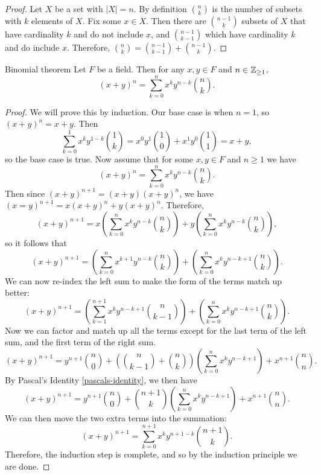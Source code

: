 \begin{proof}
    Let $X$ be a set with $|X| = n$. By definition $\binom{n}{k}$ is the number of subsets with $k$ elements of $X$. Fix some $x \in X$. Then there are $\binom{n-1}{k}$ subsets of $X$ that have cardinality $k$ and do not include $x$, and $\binom{n-1}{k-1}$ which have cardinality $k$ and do include $x$. Therefore, $\binom{n}{k} = \binom{n-1}{k-1} + \binom{n-1}{k}$.
\end{proof}

\begin{thm}{Binomial theorem}\label{binomial-theorem}\proofbreak
    Let $F$ be a field. Then for any $x, y \in F$ and $n \in \mathbb{Z}_{\geq 1}$, \[\left(x + y\right)^n = \sum_{k=0}^n x^ky^{n-k}\binom{n}{k}.\]
\end{thm}

\begin{proof}
    We will prove this by induction. Our base case is when $n = 1$, so $(x + y)^n = x + y$. Then \[\sum_{k=0}^{1}x^ky^{1-k}\binom{1}{k} = x^0y^1\binom{1}{0} + x^1y^0\binom{1}{1} = x + y,\] so the base case is true.
    Now assume that for some $x, y \in F$ and $n \geq 1$ we have \[\left(x + y\right)^n = \sum_{k=0}^n x^ky^{n-k}\binom{n}{k}.\] Then since $(x + y)^{n+1} = (x+y)(x+y)^n$, we have $(x = y)^{n+1} = x(x+y)^n + y(x+y)^n$.
    Therefore, \[\left(x + y\right)^{n+1} = x\left(\sum_{k=0}^n x^ky^{n-k}\binom{n}{k}\right) + y\left(\sum_{k=0}^n x^ky^{n-k}\binom{n}{k}\right),\] so it follows that \[\left(x + y\right)^{n+1} = \left(\sum_{k=0}^n x^{k+1}y^{n-k}\binom{n}{k}\right) + \left(\sum_{k=0}^n x^ky^{n-k+1}\binom{n}{k}\right).\]
    We can now re-index the left sum to make the form of the terms match up better: \[\left(x + y\right)^{n+1} = \left(\sum_{k=1}^{n+1} x^{k}y^{n-k+1}\binom{n}{k-1}\right) + \left(\sum_{k=0}^n x^ky^{n-k+1}\binom{n}{k}\right).\]
    Now we can factor and match up all the terms except for the last term of the left sum, and the first term of the right sum.
    \[\left(x + y\right)^{n+1} = y^{n+1}\binom{n}{0} + \left(\binom{n}{k-1} + \binom{n}{k}\right)\left(\sum_{k=0}^{n} x^{k}y^{n-k+1}\right) + x^{n+1}\binom{n}{n}.\]
    By Pascal's Identity \ref{pascals-identity}, we then have
    \[\left(x + y\right)^{n+1} = y^{n+1}\binom{n}{0} + \binom{n+1}{k}\left(\sum_{k=0}^{n} x^{k}y^{n-k+1}\right) + x^{n+1}\binom{n}{n}.\]
    We can then move the two extra terms into the summation:
    \[\left(x + y\right)^{n+1} = \sum_{k=0}^{n+1}x^{k}y^{n+1-k}\binom{n+1}{k}.\]
    Therefore, the induction step is complete, and so by the induction principle we are done.
\end{proof}

